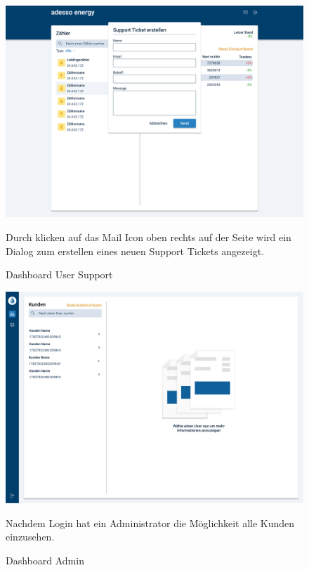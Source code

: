 \newpage

\begin{figure}[h]
	\centering
    \includegraphics[scale=0.3]{img/WebsiteMockup/Dashboard-User-Mail}
	\caption{Dashboard User Support} \hfill \break
	Durch klicken auf das Mail Icon oben rechts auf der Seite wird ein Dialog zum erstellen eines neuen Support Tickets angezeigt.
\end{figure}

\newpage

\begin{figure}[h]
	\centering
    \includegraphics[scale=0.3]{img/WebsiteMockup/Dashboard-Admin-NonSelected}
	\caption{Dashboard Admin} \hfill \break
	Nachdem Login hat ein Administrator die Möglichkeit alle Kunden einzusehen.
\end{figure}

